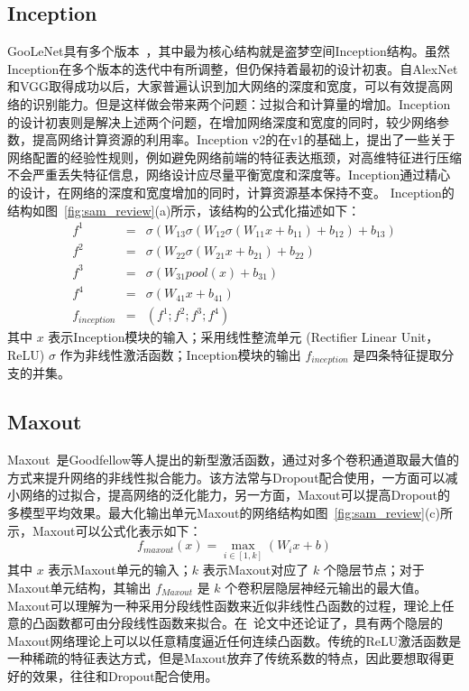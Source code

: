 \subsection{Inception}
\label{sec:sap:review:inception}

GooLeNet具有多个版本~\cite{szegedy2014going,szegedy2015rethinking,szegedy2016inception}，其中最为核心结构就是盗梦空间Inception结构。虽然Inception在多个版本的迭代中有所调整，但仍保持着最初的设计初衷。自AlexNet和VGG取得成功以后，大家普遍认识到加大网络的深度和宽度，可以有效提高网络的识别能力。但是这样做会带来两个问题：过拟合和计算量的增加。Inception的设计初衷则是解决上述两个问题，在增加网络深度和宽度的同时，较少网络参数，提高网络计算资源的利用率。Inception v2的在v1的基础上，提出了一些关于网络配置的经验性规则，例如避免网络前端的特征表达瓶颈，对高维特征进行压缩不会严重丢失特征信息，网络设计应尽量平衡宽度和深度等。Inception通过精心的设计，在网络的深度和宽度增加的同时，计算资源基本保持不变。 Inception的结构如图~\ref{fig:sam_review}(a)所示，该结构的公式化描述如下：
\begin{eqnarray} \label{equ:inception}
f^{1} &=& \sigma(W_{13}\sigma(W_{12}\sigma(W_{11}x+b_{11})+b_{12})+b_{13})\nonumber\\
f^{2} &=& \sigma(W_{22}\sigma(W_{21}x+b_{21})+b_{22})\nonumber\\
f^{3} &=& \sigma(W_{31}pool(x)+b_{31})\nonumber\\
f^{4} &=& \sigma(W_{41}x+b_{41})\nonumber\\
f_{inception} &=& (f^1; f^2; f^3; f^4)
\end{eqnarray}
其中 $x$ 表示Inception模块的输入；采用线性整流单元 (Rectifier Linear Unit，ReLU) $\sigma$ 作为非线性激活函数；Inception模块的输出 $f_{inception}$ 是四条特征提取分支的并集。

\subsection{Maxout}
\label{sec:sap:review:maxout}

Maxout~\cite{goodfellow2013maxout}是Goodfellow等人提出的新型激活函数，通过对多个卷积通道取最大值的方式来提升网络的非线性拟合能力。该方法常与Dropout配合使用，一方面可以减小网络的过拟合，提高网络的泛化能力，另一方面，Maxout可以提高Dropout的多模型平均效果。最大化输出单元Maxout的网络结构如图~\ref{fig:sam_review}(c)所示，Maxout可以公式化表示如下：
\begin{equation} \label{equ:maxout}
f_{maxout}(x)=\max\limits_{i\in[1,k]}(W_{i}x+b)
\end{equation}
其中 $x$ 表示Maxout单元的输入；$k$ 表示Maxout对应了 $k$ 个隐层节点；对于Maxout单元结构，其输出 $f_{Maxout}$ 是 $k$ 个卷积层隐层神经元输出的最大值。Maxout可以理解为一种采用分段线性函数来近似非线性凸函数的过程，理论上任意的凸函数都可由分段线性函数来拟合。在~\cite{goodfellow2013maxout}论文中还论证了，具有两个隐层的Maxout网络理论上可以以任意精度逼近任何连续凸函数。传统的ReLU激活函数是一种稀疏的特征表达方式，但是Maxout放弃了传统系数的特点，因此要想取得更好的效果，往往和Dropout配合使用。


